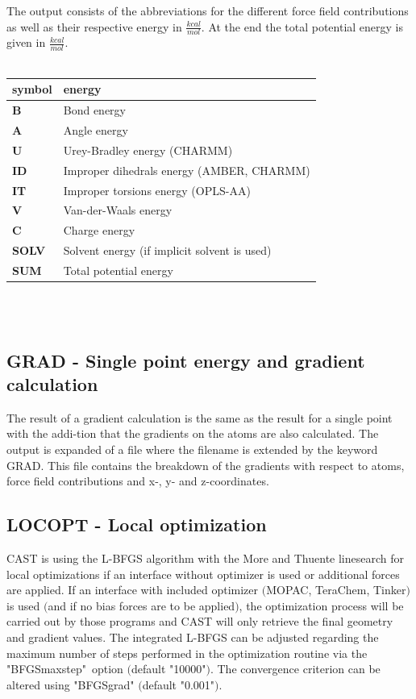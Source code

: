\documentclass[10pt,a4paper]{article} %
\begin{document}
{	The output consists of the abbreviations for the different force field contributions as well as their respective energy in $\frac{kcal}{mol}$. At the end the total potential energy is given in $\frac{kcal}{mol}$.\\~\\

	\begin{tabularx}{\textwidth}{l|l}
		symbol & energy\\
		\hline
		\textbf{B} & Bond energy\\
		\textbf{A} & Angle energy\\
		\textbf{U} & Urey-Bradley energy (CHARMM\supercite{charmm})\\
		\textbf{ID} & Improper dihedrals energy (AMBER, CHARMM)\\
		\textbf{IT} & Improper torsions energy (OPLS-AA)\\
		\textbf{V} & Van-der-Waals energy\\
		\textbf{C} & Charge energy\\
		\textbf{SOLV} & Solvent energy (if implicit solvent is used)\\
		\textbf{SUM} & Total potential energy\\

	\end{tabularx}\\~\\


	\subsection{GRAD - Single point energy and gradient calculation}
	The result of a gradient calculation is the same as the result for a single point with the addi-tion that the gradients on the atoms are also calculated. The output is expanded of a file where the filename is extended by the keyword GRAD. This file contains the breakdown of the gradients with respect to atoms, force field contributions and x-, y- and z-coordinates.

	\subsection{LOCOPT - Local optimization}
	CAST is using the L-BFGS algorithm with the More and Thuente linesearch for local optimizations if an interface without optimizer is used or additional forces are applied.
	If an interface with included optimizer $($MOPAC, TeraChem, Tinker$)$ is used $($and if no bias forces are to be applied$)$, the optimization process will be carried out by those programs and CAST will only retrieve the final geometry and gradient values.
	The integrated L-BFGS can be adjusted regarding the maximum number of steps performed in the optimization routine via the "BFGSmaxstep"\ option $($default "10000"$)$.
	The convergence criterion can be altered using "BFGSgrad" $($default "0.001"$)$.

}
\end{document}
